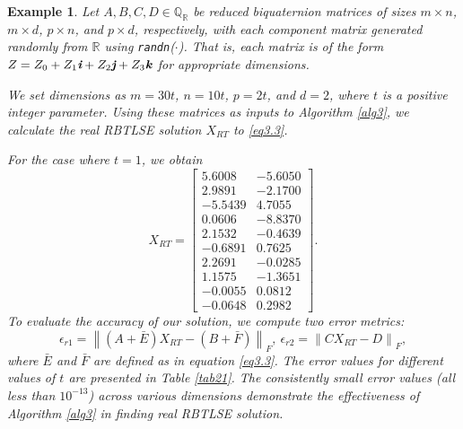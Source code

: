 \documentclass[preprint,11pt,3p]{elsarticle}
\newtheorem{example}[theorem]{Example}
\newcommand\norm[1]{\left\lVert#1\right\rVert}
\def \QR{\mathbb{Q}_\mathbb{R}}
\def \i{\textit{\textbf{i}}}
\def \j{\textit{\textbf{j}}}
\def \k{\textit{\textbf{k}}}
\begin{document}
 \begin{example} \label{ex2}
Let \( A, B, C, D \in \QR \) be reduced biquaternion matrices of sizes \( m \times n \), \( m \times d \), \( p \times n \), and \( p \times d \), respectively, with each component matrix generated randomly from \( \mathbb{R} \) using \texttt{randn}(\(\cdot\)). That is, each matrix is of the form \( Z = Z_0 + Z_1\i + Z_2\j + Z_3\k \) for appropriate dimensions.

We set dimensions as $m=30t$, $n=10t$, $p=2t$, and $d=2$, where $t$ is a positive integer parameter. Using these matrices as inputs to Algorithm \ref{alg3}, we calculate the real RBTLSE solution $X_{RT}$ to \eqref{eq3.3}.
	
	For the case where $t=1$, we obtain
	\begin{equation*}
		X_{RT} = \begin{bmatrix}
			5.6008 & -5.6050 \\
			2.9891 & -2.1700 \\
			-5.5439 & 4.7055 \\
			0.0606 & -8.8370 \\
			2.1532 & -0.4639 \\
			-0.6891 & 0.7625 \\
			2.2691 & -0.0285 \\
			1.1575 & -1.3651 \\
			-0.0055 & 0.0812 \\
			-0.0648 & 0.2982
		\end{bmatrix}.
	\end{equation*}
	To evaluate the accuracy of our solution, we compute two error metrics:
	\begin{equation*}
		\epsilon_{r1}=\norm{(A+\bar{E})X_{RT}-(B+\bar{F})}_F,  ~ \epsilon_{r2}=\norm{CX_{RT}-D}_F,
	\end{equation*}
	where $\bar{E}$ and $\bar{F}$ are defined as in equation \eqref{eq3.3}. The error values for different values of $t$ are presented in Table \ref{tab21}. The consistently small error values (all less than $10^{-13}$) across various dimensions demonstrate the effectiveness of Algorithm \ref{alg3}  in finding real RBTLSE solution.
\end{example}
\end{document}
